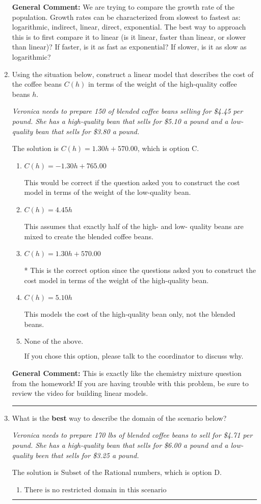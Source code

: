 \documentclass{extbook}[14pt]
\newcommand{\litem}[1]{\item #1

\rule{\textwidth}{0.4pt}}
\begin{document}
\begin{enumerate}
{\textbf{General Comment:} We are trying to compare the growth rate of the population. Growth rates can be characterized from slowest to fastest as: logarithmic, indirect, linear, direct, exponential. The best way to approach this is to first compare it to linear (is it linear, faster than linear, or slower than linear)? If faster, is it as fast as exponential? If slower, is it as slow as logarithmic?
}
\litem{
Using the situation below, construct a linear model that describes the cost of the coffee beans $C(h)$ in terms of the weight of the high-quality coffee beans $h$.

\begin{center}
    \textit{ Veronica needs to prepare 150 of blended coffee beans selling for \$4.45 per pound. She has a high-quality bean that sells for \$5.10 a pound and a low-quality bean that sells for \$3.80 a pound. }
\end{center}
The solution is \( C(h) = 1.30 h + 570.00 \), which is option C.\begin{enumerate}[label=\Alph*.]
\item \( C(h) = -1.30 h + 765.00 \)

This would be correct if the question asked you to construct the cost model in terms of the weight of the low-quality bean.
\item \( C(h) = 4.45 h \)

This assumes that exactly half of the high- and low- quality beans are mixed to create the blended coffee beans.
\item \( C(h) = 1.30 h + 570.00 \)

* This is the correct option since the questions asked you to construct the cost model in terms of the weight of the high-quality bean.
\item \( C(h) = 5.10 h \)

This models the cost of the high-quality bean only, not the blended beans.
\item \( \text{None of the above.} \)

If you chose this option, please talk to the coordinator to discuss why.
\end{enumerate}

\textbf{General Comment:} This is exactly like the chemistry mixture question from the homework! If you are having trouble with this problem, be sure to review the video for building linear models.
}
\litem{
What is the \textbf{best} way to describe the domain of the scenario below?

\begin{center}
    \textit{ Veronica needs to prepare 170 lbs of blended coffee beans to sell for \$4.71 per pound. She has a high-quality bean that sells for \$6.00 a pound and a low-quality been that sells for \$3.25 a pound. }
\end{center}
The solution is \( \text{Subset of the Rational numbers} \), which is option D.\begin{enumerate}[label=\Alph*.]
\item \( \text{There is no restricted domain in this scenario} \)


\end{enumerate}}
\end{enumerate}
\end{document}
